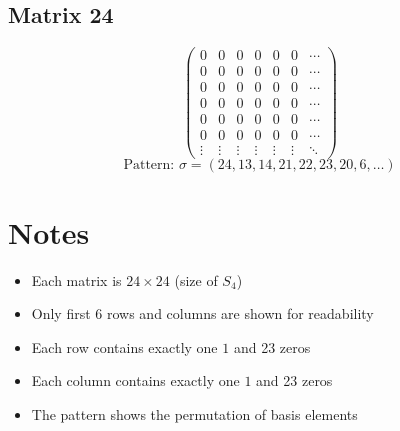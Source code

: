 \documentclass{article}
\begin{document}
\subsection*{Matrix 24}
\[
\begin{pmatrix}
  0 & 0 & 0 & 0 & 0 & 0 & \cdots \\
  0 & 0 & 0 & 0 & 0 & 0 & \cdots \\
  0 & 0 & 0 & 0 & 0 & 0 & \cdots \\
  0 & 0 & 0 & 0 & 0 & 0 & \cdots \\
  0 & 0 & 0 & 0 & 0 & 0 & \cdots \\
  0 & 0 & 0 & 0 & 0 & 0 & \cdots \\
\vdots & \vdots & \vdots & \vdots & \vdots & \vdots & \ddots
\end{pmatrix}
\]
\[
\text{Pattern: } \sigma = (24, 13, 14, 21, 22, 23, 20, 6, \ldots)
\]
\vspace{0.5em}

\section*{Notes}

\begin{itemize}
\item Each matrix is $24 \times 24$ (size of $S_4$)
\item Only first 6 rows and columns are shown for readability
\item Each row contains exactly one $1$ and 23 zeros
\item Each column contains exactly one $1$ and 23 zeros
\item The pattern shows the permutation of basis elements
\end{itemize}
\end{document}
